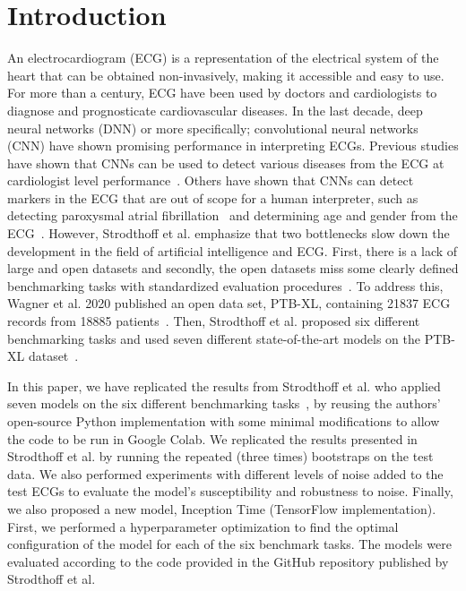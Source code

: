 \section{Introduction}
An electrocardiogram (ECG) is a representation of the electrical system of the heart that can be obtained non-invasively, making it accessible and easy to use. For more than a century, ECG have been used by doctors and cardiologists to diagnose and prognosticate cardiovascular diseases. In the last decade, deep neural networks (DNN) or more specifically; convolutional neural networks (CNN)  have shown promising performance in interpreting ECGs. Previous studies have shown that CNNs can be used to detect various diseases from the ECG at cardiologist level performance~\cite{hannun_cardiologist-level_2019}. Others have shown that CNNs can detect markers in the ECG that are out of scope for a human interpreter, such as detecting paroxysmal atrial fibrillation~\cite{attia_et_al_artificial_2019} and determining age and gender from the ECG~\cite{attia_et_al_age_2019}. 
However, Strodthoff et al. emphasize that two bottlenecks slow down the development in the field of artificial intelligence and ECG. First, there is a lack of large and open datasets and secondly, the open datasets miss some clearly defined benchmarking tasks with standardized evaluation procedures~\cite{strodthoff_deep_2020}. To address this, Wagner et al. 2020 published an open data set, PTB-XL, containing 21837 ECG records from 18885 patients~\cite{wagner_et_al_ptb-xl_2020}. Then, Strodthoff et al. proposed six different benchmarking tasks and used seven different state-of-the-art models on the PTB-XL dataset~\cite{strodthoff_deep_2020}.

In this paper, we have replicated the results from Strodthoff et al. who applied seven models on the six different benchmarking tasks~\cite{strodthoff_deep_2020}, by reusing the authors' open-source Python implementation with some minimal modifications to allow the code to be run in Google Colab. We replicated the results presented in Strodthoff et al. by running the repeated (three times) bootstraps on the test data. We also performed experiments with different levels of noise added to the test ECGs to evaluate the model's susceptibility and robustness to noise. Finally, we also proposed a new model, Inception Time (TensorFlow implementation). First, we performed a hyperparameter optimization to find the optimal configuration of the model for each of the six benchmark tasks. The models were evaluated according to the code provided in the GitHub repository published by Strodthoff et al.




